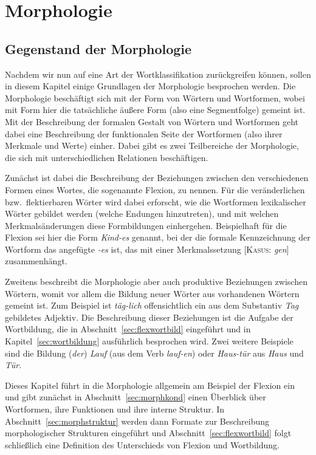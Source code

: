 \chapter{Morphologie}

\label{sec:morphologie}

\section{Gegenstand der Morphologie}

Nachdem wir nun auf eine Art der Wortklassifikation zurückgreifen können, sollen in diesem Kapitel einige Grundlagen der Morphologie besprochen werden.
Die Morphologie beschäftigt sich mit der Form von Wörtern und Wortformen, wobei mit Form hier die tatsächliche äußere Form (also eine Segmentfolge) gemeint ist.
Mit der Beschreibung der formalen Gestalt von Wörtern und Wortformen geht dabei eine Beschreibung der funktionalen Seite der Wortformen (also ihrer Merkmale und Werte) einher.
Dabei gibt es zwei Teilbereiche der Morphologie, die sich mit unterschiedlichen Relationen beschäftigen.

Zunächst ist dabei die Beschreibung der Beziehungen zwischen den verschiedenen Formen eines Wortes, die sogenannte Flexion, zu nennen.
Für die veränderlichen bzw.\ flektierbaren Wörter wird dabei erforscht, wie die Wortformen lexikalischer Wörter gebildet werden (\zB welche Endungen hinzutreten), und mit welchen Merkmalsänderungen diese Formbildungen einhergehen.
Beispielhaft für die Flexion sei hier die Form \textit{Kind-es} genannt, bei der die formale Kennzeichnung der Wortform das angefügte \textit{-es} ist, das mit einer Merkmalssetzung [\textsc{Kasus}: \textit{gen}] zusammenhängt.

Zweitens beschreibt die Morphologie aber auch produktive Beziehungen zwischen Wörtern, womit vor allem die Bildung neuer Wörter aus vorhandenen Wörtern gemeint ist.
Zum Beispiel ist \textit{täg-lich} offensichtlich ein aus dem Substantiv \textit{Tag} gebildetes Adjektiv.
Die Beschreibung dieser Beziehungen ist die Aufgabe der Wortbildung, die in Abschnitt~\ref{sec:flexwortbild} eingeführt und in Kapitel~\ref{sec:wortbildung} ausführlich besprochen wird.
Zwei weitere Beispiele sind die Bildung (\textit{der}) \textit{Lauf} (aus dem Verb \textit{lauf-en}) oder \textit{Haus-tür} aus \textit{Haus} und \textit{Tür}.

Dieses Kapitel führt in die Morphologie allgemein am Beispiel der Flexion ein und gibt zunächst in Abschnitt~\ref{sec:morphkond} einen Überblick über Wortformen, ihre Funktionen und ihre interne Struktur.
In Abschnitt~\ref{sec:morphstruktur} werden dann Formate zur Beschreibung morphologischer Strukturen eingeführt und Abschnitt~\ref{sec:flexwortbild} folgt schließlich eine Definition des Unterschieds von Flexion und Wortbildung.

